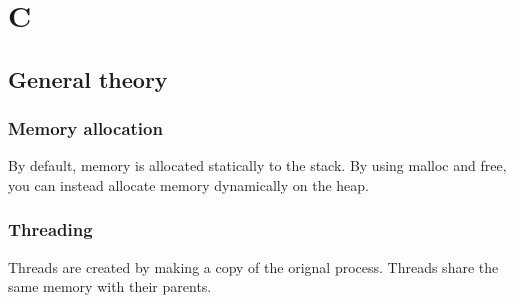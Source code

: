 \section{C}

\subsection{General theory}

\subsubsection{Memory allocation}
By default, memory is allocated statically to the stack.
By using malloc and free, you can instead allocate memory dynamically on the heap.

\subsubsection{Threading}
Threads are created by making a copy of the orignal process.
Threads share the same memory with their parents.



